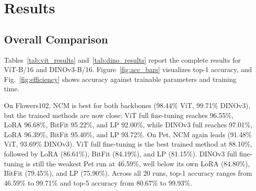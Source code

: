 \documentclass[journal,11pt]{IEEEtran}
\begin{document}
\section{Results}
\label{sec:results}

\subsection{Overall Comparison}
Tables~\ref{tab:vit_results} and~\ref{tab:dino_results} report the complete results for ViT-B/16 and DINOv3-B/16. Figure~\ref{fig:acc_bars} visualizes top-1 accuracy, and Fig.~\ref{fig:efficiency} shows accuracy against trainable parameters and training time.

On Flowers102, NCM is best for both backbones (98.44\% ViT, 99.71\% DINOv3), but the trained methods are now close: ViT full fine-tuning reaches 96.55\%, LoRA 96.68\%, BitFit 95.22\%, and LP 92.00\%, while DINOv3 full reaches 97.01\%, LoRA 96.39\%, BitFit 95.40\%, and LP 93.72\%. On Pet, NCM again leads (91.48\% ViT, 93.69\% DINOv3). ViT full fine-tuning is the best trained method at 88.10\%, followed by LoRA (86.61\%), BitFit (84.19\%), and LP (81.15\%). DINOv3 full fine-tuning is still the weakest Pet run at 46.59\%, well below its own LoRA (84.80\%), BitFit (79.45\%), and LP (75.90\%). Across all 20 runs, top-1 accuracy ranges from 46.59\% to 99.71\% and top-5 accuracy from 80.67\% to 99.93\%.
\end{document}
